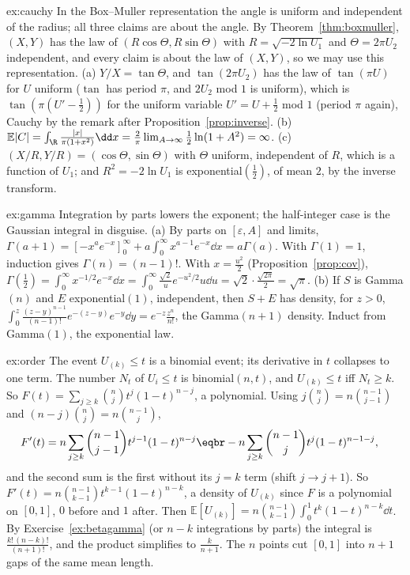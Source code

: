 \begin{solution}{ex:cauchy}
\idea In the Box--Muller representation the angle is uniform and independent of the radius; all three claims are about
the angle.
\writeup By Theorem~\ref{thm:boxmuller}, $(X,Y)$ has the law of $(R\cos\Theta,R\sin\Theta)$ with $R=\sqrt{-2\ln U_1}$ and $\Theta=2\pi U_2$ independent, and every
claim is about the law of $(X,Y)$, so we may use this representation. (a) $Y/X=\tan\Theta$, and $\tan(2\pi U_2)$ has the law of $\tan(\pi U)$ for
$U$ uniform ($\tan$ has period $\pi$, and $2U_2$ mod $1$ is uniform), which is $\tan(\pi(U'-\frac12))$ for the uniform variable $U'=U+\frac12$ mod $1$ (period $\pi$ again), Cauchy by the remark after
Proposition~\ref{prop:inverse}. (b) $\mathbb E|C|=\int_\R\frac{|x|}{\pi(1+x^2)}\dd x=\frac2\pi\lim_{A\to\infty}\frac12\ln(1+A^2)=\infty$. (c) $(X/R,Y/R)=(\cos\Theta,\sin\Theta)$ with $\Theta$ uniform,
independent of $R$, which is a function of $U_1$; and $R^2=-2\ln U_1$ is exponential$(\frac12)$, of mean $2$, by the inverse transform.
\end{solution}

\begin{solution}{ex:gamma}
\idea Integration by parts lowers the exponent; the half-integer case is the Gaussian integral in disguise.
\writeup (a) By parts on $[\varepsilon,A]$ and limits, $\Gamma(a+1)=[-x^ae^{-x}]_0^\infty+a\int_0^\infty x^{a-1}e^{-x}\dd x=a\Gamma(a)$. With $\Gamma(1)=1$, induction gives
$\Gamma(n)=(n-1)!$. With $x=\frac{u^2}2$ (Proposition~\ref{prop:cov}), $\Gamma(\frac12)=\int_0^\infty x^{-1/2}e^{-x}\dd x=\int_0^\infty\frac{\sqrt2}ue^{-u^2/2}u\dd u=\sqrt2\cdot\frac{\sqrt{2\pi}}2=\sqrt\pi$.
(b) If $S$ is Gamma$(n)$ and $E$ exponential$(1)$, independent, then $S+E$ has density, for $z>0$,
$\int_0^z\frac{(z-y)^{n-1}}{(n-1)!}e^{-(z-y)}e^{-y}\dd y=e^{-z}\frac{z^n}{n!}$, the Gamma$(n+1)$ density. Induct from Gamma$(1)$, the exponential law.
\end{solution}

\begin{solution}{ex:order}
\idea The event $U_{(k)}\le t$ is a binomial event; its derivative in $t$ collapses to one term.
\writeup The number $N_t$ of $U_i\le t$ is binomial$(n,t)$, and $U_{(k)}\le t$ iff $N_t\ge k$. So $F(t)=\sum_{j\ge k}\binom njt^j(1-t)^{n-j}$, a polynomial. Using
$j\binom nj=n\binom{n-1}{j-1}$ and $(n-j)\binom nj=n\binom{n-1}j$,
\[
\begin{aligned}F'(t)&=n\sum_{j\ge k}\binom{n-1}{j-1}t^{j-1}(1-t)^{n-j}\eqbr-n\sum_{j\ge k}\binom{n-1}jt^j(1-t)^{n-1-j},\end{aligned}
\]
and the second sum is the first without its $j=k$ term (shift $j\to j+1$). So $F'(t)=n\binom{n-1}{k-1}t^{k-1}(1-t)^{n-k}$, a density of $U_{(k)}$ since $F$ is a polynomial on $[0,1]$, $0$ before and $1$ after. Then $\mathbb E[U_{(k)}]=n\binom{n-1}{k-1}\int_0^1t^k(1-t)^{n-k}\dd t$. By Exercise~\ref{ex:betagamma} (or $n-k$ integrations by parts) the integral is
$\frac{k!\,(n-k)!}{(n+1)!}$, and the product simplifies to $\frac k{n+1}$. The $n$ points cut $[0,1]$ into $n+1$ gaps of the same mean length.
\end{solution}

